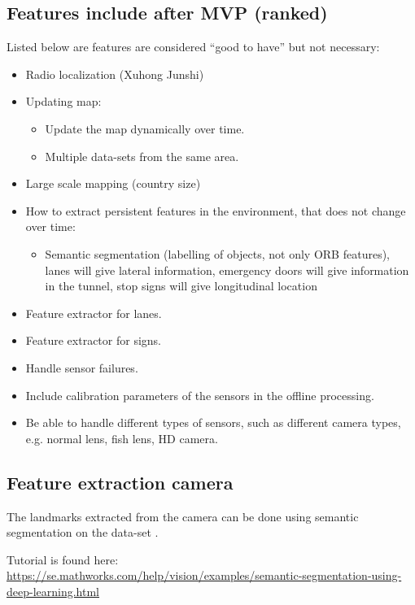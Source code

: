 \subsection{Features include after MVP (ranked)}

Listed below are features are considered ``good to have'' but not
necessary:

\begin{itemize}
\item Radio localization  (Xuhong  Junshi)
\item Updating map:
  \begin{itemize}
  \item Update the map dynamically over time.
  \item Multiple data-sets from the same area.
  \end{itemize}
\item Large scale mapping (country size)
\item How to extract persistent features in the environment, that does
  not change over time:
  \begin{itemize}
  \item  Semantic segmentation (labelling of objects, not only ORB
    features), lanes will give lateral information, emergency doors
    will give information in the tunnel, stop signs will give
    longitudinal location
  \end{itemize}
\item Feature extractor for lanes.
\item Feature extractor for signs.
\item Handle sensor failures.
\item Include calibration parameters of the sensors in the offline processing.
\item Be able to handle different types of sensors, such as different camera types, e.g. normal lens, fish lens, HD camera.
\end{itemize}

\subsection{Feature extraction camera}

The landmarks extracted from the camera can be done using semantic
segmentation on the data-set \cite{Brostow:2009:SOC:1464534.1465403}.

Tutorial is found here:
\url{https://se.mathworks.com/help/vision/examples/semantic-segmentation-using-deep-learning.html}

